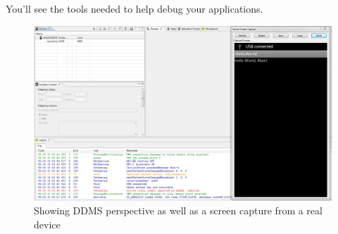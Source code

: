 You'll see the tools needed to help debug your applications.

\begin{figure}[!ht]
  \includegraphics[width=\textwidth]{./images/hello_world_real.png}%
  \caption{Showing DDMS perspective as well as a screen capture from a real device}
  \label{fig:real_hello_world}
\end{figure}